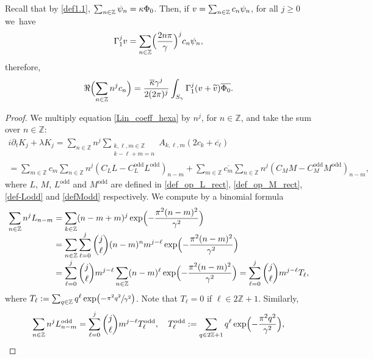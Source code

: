 \documentclass[JEP,XML,SOM,Unicode,NoFloatCountersInSection,published]{cedram}
\theoremstyle{definition}
\let\EE\exp
\let\dis\relax
\let\ov\overline
\newcommand\Z{\mathbb Z}
\newcommand{\Bpa}[1]{\Bigl(#1\Bigr)}
\begin{document}
Recall that by \eqref{def1.1}, $\dis \sum_{n \in \Z} \psi_n= \kappa \Phi_0$. Then, if $ \dis v=\sum_{n \in \Z} c_n \psi_n $, for all $j \geq 0$ we~have\vspace*{-3pt}
\[
\Gamma^j_1 v=\sum_{n \in \Z} \Bigl(\frac{2 n \pi}\gamma\Bigr)^j c_n \psi_n, 
\]
therefore,\vspace*{-3pt}
\begin{equation*}
\Re\Bpa{\sum_{n\in\Z}n^jc_n} =\frac{\ov{\kappa} \gamma^j}{2(2\pi)^j} \int_{S_{\gamma}} \Gamma^j_1 (v+\widetilde{v}) \ov{\Phi_0}.
\end{equation*}

\begin{proof}
We multiply equation \eqref{Lin_coeff_hexa} by $n^j$, for $n\in\Z$, and take the sum over $n \in \Z$:\vspace*{-3pt}
\begin{multline} \label{sum_Kj}
i\partial_t K_j + \lambda K_j = \sum_{n \in \Z}n^j\sum_{\substack {k, \ell, m \in \Z\\ k-\ell+m=n}}A_{k,\ell,m}(2c_{k} + \ov{c_{\ell}}) \\[-3pt]
= \sum_{m\in\Z}c_m\sum_{n\in\Z} n^j {(C_LL-C_L^{\text{odd}}L^{\text{odd}})}_{n-m} + \sum_{m\in\Z}\ov{c_m}\sum_{n\in\Z} n^j {(C_MM-C_M^{\text{odd}}M^{\text{odd}})}_{n-m},
\end{multline}
where $L$, $M$, $L^{\text{odd}}$ and $M^{\text{odd}}$ are defined in \eqref{def_op_L_rect}, \eqref{def_op_M_rect}, \eqref{def-Lodd} and \eqref{defModd} respectively.
We compute by a binomial formula\vspace*{-3pt}
\begin{align*}
\sum_{n\in\Z} n^j L_{n-m} &=\sum_{k\in\Z} (n-m+m)^j \EE\Bigl({-\frac{\pi^2(n-m)^2}{\gamma^2}}\Bigr)\\[-5pt]
&= \sum_{n \in \Z}\sum_{\ell=0}^j \dbinom{j}{\ell}(n-m)^nm^{j-\ell}\EE\Bigl({-\frac{\pi^2(n-m)^2}{\gamma^2}}\Bigr) \\[-3pt]
&=\sum_{\ell=0}^j \dbinom{j}{\ell} m^{j-\ell} \sum_{n\in\Z}(n-m)^\ell\EE\Bigl({-\frac{\pi^2(n-m)^2}{\gamma^2}}\Bigr)= \sum_{\ell=0}^j \dbinom{j}{\ell} m^{j-\ell} T_\ell,
\end{align*}
where $T_\ell:= \sum_{q\in\Z}q^\ell\EE\bigl({-\sfrac{\pi^2q^2}{\gamma^2}}\bigr)$.
Note that $T_\ell = 0$ if $\ell \in 2\Z+1$. Similarly,\vspace*{-3pt}
\begin{equation*}
\sum_{n\in\Z} n^j L_{n-m}^{\text{odd}} = \sum_{\ell=0}^j \dbinom{j}{\ell} m^{j-\ell} T_\ell^{\text{odd}}, \quad T_\ell^{\text{odd}}:=\sum_{q\in2\Z+1}q^\ell\EE\Bigl({-\frac{\pi^2q^2}{\gamma^2}}\Bigr),

\end{equation*}
\end{proof}
\end{document}
